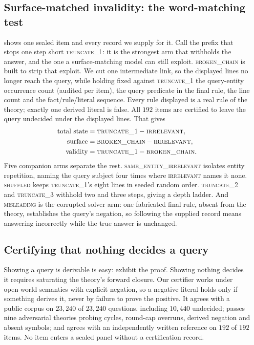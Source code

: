 \documentclass[10pt,twocolumn]{article}
\begin{document}
\subsection{Surface-matched invalidity: the word-matching test}
\label{sec:broken}
 shows one sealed item and every record we supply for it.
Call the prefix that stops one step short \textsc{truncate\_1}: it is the
strongest arm that withholds the answer, and the one a surface-matching model
can still exploit. \textsc{broken\_chain} is built to strip that exploit. We cut
one intermediate link, so the displayed lines no longer reach the query, while
holding fixed against \textsc{truncate\_1} the query-entity occurrence count
(audited per item), the query predicate in the final rule, the line count and
the fact/rule/literal sequence. Every rule displayed is a real rule of the
theory; exactly one derived literal is false. All $192$ items are certified to
leave the query undecided under the displayed lines. That gives
\begin{align}
\text{total state} &= \textsc{truncate\_1} - \textsc{irrelevant},\\
\text{surface} &= \textsc{broken\_chain} - \textsc{irrelevant},\\
\text{validity} &= \textsc{truncate\_1} - \textsc{broken\_chain}.
\end{align}
Five companion arms separate the rest.
\textsc{same\_entity\_irrelevant} isolates entity repetition, naming the query
subject four times where \textsc{irrelevant} names it none.
\textsc{shuffled} keeps \textsc{truncate\_1}'s eight lines in seeded random
order. \textsc{truncate\_2} and \textsc{truncate\_3} withhold two and three
steps, giving a depth ladder. And \textsc{misleading} is the corrupted-solver
arm: one fabricated final rule, absent from the theory, establishes the query's
negation, so following the supplied record means answering incorrectly while the
true answer is unchanged.

\subsection{Certifying that nothing decides a query}

Showing a query is derivable is easy: exhibit the proof. Showing nothing decides
it requires saturating the theory's forward closure. Our certifier works under
open-world semantics with explicit negation, so a negative literal holds only if
something derives it, never by failure to prove the positive. It agrees with a
public corpus \citep{tafjord2020proofwriter} on $23{,}240$ of $23{,}240$
questions, including $10{,}440$ undecided; passes nine adversarial theories
probing cycles, round-cap overruns, derived negation and absent symbols; and
agrees with an independently written reference on $192$ of $192$ items. No item
enters a sealed panel without a certification record.
\end{document}
